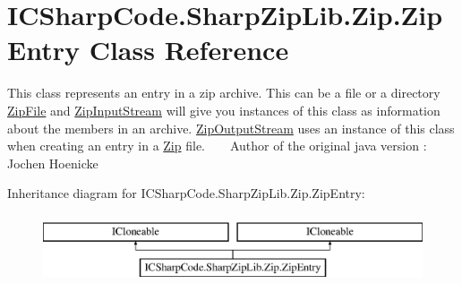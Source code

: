 \hypertarget{class_i_c_sharp_code_1_1_sharp_zip_lib_1_1_zip_1_1_zip_entry}{}\section{I\+C\+Sharp\+Code.\+Sharp\+Zip\+Lib.\+Zip.\+Zip\+Entry Class Reference}
\label{class_i_c_sharp_code_1_1_sharp_zip_lib_1_1_zip_1_1_zip_entry}


This class represents an entry in a zip archive. This can be a file or a directory \hyperlink{class_i_c_sharp_code_1_1_sharp_zip_lib_1_1_zip_1_1_zip_file}{Zip\+File} and \hyperlink{class_i_c_sharp_code_1_1_sharp_zip_lib_1_1_zip_1_1_zip_input_stream}{Zip\+Input\+Stream} will give you instances of this class as information about the members in an archive. \hyperlink{class_i_c_sharp_code_1_1_sharp_zip_lib_1_1_zip_1_1_zip_output_stream}{Zip\+Output\+Stream} uses an instance of this class when creating an entry in a \hyperlink{namespace_i_c_sharp_code_1_1_sharp_zip_lib_1_1_zip}{Zip} file. ~\newline
 ~\newline
Author of the original java version \+: Jochen Hoenicke  


Inheritance diagram for I\+C\+Sharp\+Code.\+Sharp\+Zip\+Lib.\+Zip.\+Zip\+Entry\+:\begin{figure}[H]
\begin{center}
\leavevmode
\includegraphics[height=2.000000cm]{class_i_c_sharp_code_1_1_sharp_zip_lib_1_1_zip_1_1_zip_entry}
\end{center}
\end{figure}
